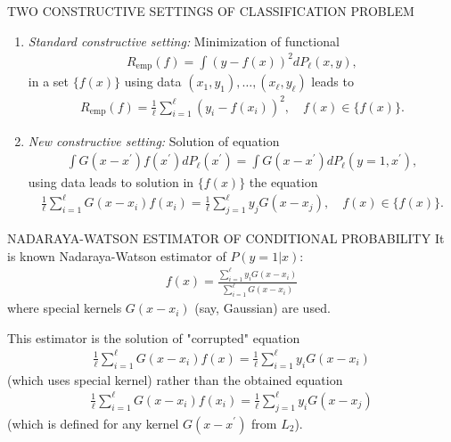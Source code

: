 \documentclass[11pt]{beamer}
\begin{document}
\begin{frame}{TWO CONSTRUCTIVE SETTINGS OF CLASSIFICATION PROBLEM}
\begin{enumerate}
\item \emph{Standard constructive setting:} Minimization of functional
\begin{align*}
R_{\text{emp}}(f) = \int (y - f(x))^{2}dP_{\ell}(x, y),
\end{align*}
in a set $\{f(x)\}$ using data $(x_{1}, y_{1}), \ldots, (x_{\ell}, y_{\ell})$ leads to
\begin{align*}
R_{\text{emp}}(f) = \frac{1}{\ell}\sum_{i=1}^{\ell}(y_{i} - f(x_{i}))^{2}, \quad f(x) \in \{f(x)\}.
\end{align*}
\hrulefill
\item \emph{New constructive setting:} Solution of equation
\begin{align*}
\int G(x - x^{\prime})f(x^{\prime})dP_{\ell}(x^{\prime}) = \int G(x - x^{\prime})dP_{\ell}(y = 1, x^{\prime}),
\end{align*}
using data leads to solution in $\{f(x)\}$ the equation
\begin{align*}
\frac{1}{\ell}\sum_{i=1}^{\ell}G(x-x_{i})f(x_{i}) = \frac{1}{\ell}\sum_{j=1}^{\ell}y_{j}G(x-x_{j}), \quad f(x) \in \{f(x)\}.
\end{align*}
\end{enumerate}
\end{frame}

\begin{frame}{NADARAYA-WATSON ESTIMATOR OF CONDITIONAL PROBABILITY}
It is known Nadaraya-Watson estimator of $P(y=1|x)$:
\begin{align*}
f(x) = \frac{\sum_{i=1}^{\ell}y_{i}G(x-x_{i})}{\sum_{i=1}^{\ell}G(x-x_{i})}
\end{align*}
where special kernels $G(x-x_{i})$ (say, Gaussian) are used.

This estimator is the solution of "corrupted" equation
\begin{align*}
\frac{1}{\ell}\sum_{i=1}^{\ell}G(x-x_{i})f(x) = \frac{1}{\ell}\sum_{i=1}^{\ell}y_{i}G(x-x_{i})
\end{align*}
(which uses special kernel) rather than the obtained equation
\begin{align*}
\frac{1}{\ell}\sum_{i=1}^{\ell}G(x-x_{i})f(x_{i}) = \frac{1}{\ell}\sum_{j=1}^{\ell}y_{i}G(x-x_{j})
\end{align*}
(which is defined for any kernel $G(x-x^{\prime})$ from $L_{2}$).
\end{frame}
\end{document}
